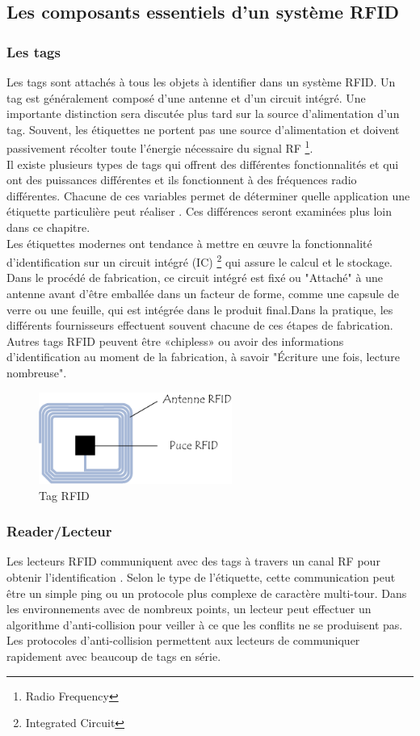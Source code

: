 \documentclass[11pt, a4paper, twoside]{book}
\begin{document}
\subsection{Les composants essentiels d'un système RFID}
\subsubsection{Les tags}
Les tags sont attachés à tous les objets à identifier dans un système RFID. Un tag est généralement
composé d'une antenne et d'un circuit intégré. Une importante
distinction sera discutée plus tard sur la source d'alimentation d'un tag. Souvent, les étiquettes ne portent pas une source d'alimentation et doivent passivement récolter toute l'énergie nécessaire du signal RF \footnote{Radio Frequency}.\\

Il existe plusieurs types de tags qui offrent des différentes fonctionnalités et qui ont des puissances différentes
et ils fonctionnent à des fréquences radio différentes. Chacune de ces variables permet de déterminer
quelle application une étiquette particulière peut réaliser . Ces différences seront examinées plus loin dans ce chapitre.\\

Les étiquettes modernes ont tendance à mettre en œuvre la fonctionnalité d'identification sur un circuit intégré (IC) \footnote{Integrated Circuit} qui
assure le calcul et le stockage. Dans le procédé de fabrication, ce circuit intégré est fixé ou
"Attaché" à une antenne avant d'être emballée dans un facteur de forme, comme une capsule de verre ou une feuille, qui est intégrée dans le produit final.Dans la pratique, les différents fournisseurs effectuent souvent chacune de ces étapes de fabrication. Autres tags RFID peuvent être «chipless» ou avoir des informations d'identification au moment de la fabrication, à savoir
"Écriture une fois, lecture nombreuse". \\
\begin{figure}[H]
\centering
\includegraphics[height=3cm]{tag}
\caption{Tag RFID}
\end{figure}
\subsubsection{Reader/Lecteur}
Les lecteurs RFID communiquent avec des tags à travers un canal RF pour obtenir l'identification
. Selon le type de l'étiquette, cette communication peut être un simple ping ou un protocole plus complexe de caractère multi-tour. Dans les environnements avec de nombreux points, un lecteur peut effectuer un algorithme d'anti-collision pour veiller à ce que les conflits ne se produisent pas. Les protocoles d'anti-collision permettent aux lecteurs de communiquer rapidement avec beaucoup de tags en série.\\
\end{document}
